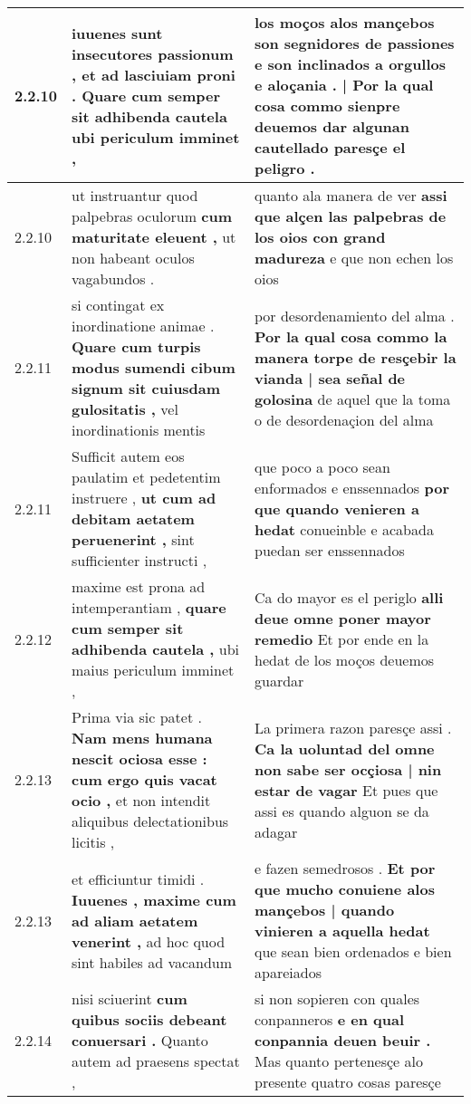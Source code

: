\begin{tabular}{|p{1cm}|p{6.5cm}|p{6.5cm}|}
2.2.10 & iuuenes sunt insecutores passionum , \textbf{ et ad lasciuiam proni . Quare cum semper sit adhibenda cautela } ubi periculum imminet , & los moços alos mançebos son segnidores de passiones \textbf{ e son inclinados a orgullos e aloçania . | Por la qual cosa commo sienpre deuemos dar } algunan cautellado paresçe el peligro . \\\hline
2.2.10 & ut instruantur quod palpebras oculorum \textbf{ cum maturitate eleuent , } ut non habeant oculos vagabundos . & quanto ala manera de ver \textbf{ assi que alçen las palpebras de los oios con grand madureza } e que non echen los oios \\\hline
2.2.11 & si contingat ex inordinatione animae . \textbf{ Quare cum turpis modus sumendi cibum signum sit cuiusdam gulositatis , } vel inordinationis mentis & por desordenamiento del alma . \textbf{ Por la qual cosa commo la manera torpe de resçebir la vianda | sea señal de golosina } de aquel que la toma o de desordenaçion del alma \\\hline
2.2.11 & Sufficit autem eos paulatim et pedetentim instruere , \textbf{ ut cum ad debitam aetatem peruenerint , } sint sufficienter instructi , & que poco a poco sean enformados e enssennados \textbf{ por que quando venieren a hedat } conueinble e acabada puedan ser enssennados \\\hline
2.2.12 & maxime est prona ad intemperantiam , \textbf{ quare cum semper sit adhibenda cautela , } ubi maius periculum imminet , & Ca do mayor es el periglo \textbf{ alli deue omne poner mayor remedio } Et por ende en la hedat de los moços deuemos guardar \\\hline
2.2.13 & Prima via sic patet . \textbf{ Nam mens humana nescit ociosa esse : cum ergo quis vacat ocio , } et non intendit aliquibus delectationibus licitis , & La primera razon paresçe assi . \textbf{ Ca la uoluntad del omne non sabe ser ocçiosa | nin estar de vagar } Et pues que assi es quando alguon se da adagar \\\hline
2.2.13 & et efficiuntur timidi . \textbf{ Iuuenes , maxime cum ad aliam aetatem venerint , } ad hoc quod sint habiles ad vacandum & e fazen semedrosos . \textbf{ Et por que mucho conuiene alos mançebos | quando vinieren a aquella hedat } que sean bien ordenados e bien apareiados \\\hline
2.2.14 & nisi sciuerint \textbf{ cum quibus sociis debeant conuersari . } Quanto autem ad praesens spectat , & si non sopieren con quales conpanneros \textbf{ e en qual conpannia deuen beuir . } Mas quanto pertenesçe alo presente quatro cosas paresçe \\\hline

\end{tabular}

